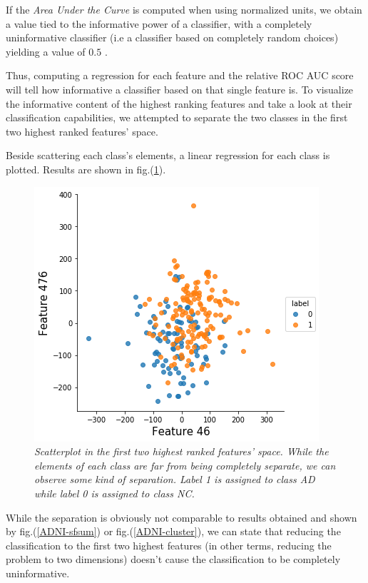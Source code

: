 \documentclass[12pt,openright,twoside,a4paper]{book}
\begin{document}
If the \textit{Area Under the Curve} is computed when using normalized units, we obtain a value tied to the informative power of a classifier, with a completely uninformative classifier (i.e a classifier based on completely random choices) yielding a value of $0.5$ \cite{ROC}.

Thus, computing a regression for each feature and the relative ROC AUC score will tell how informative a classifier based on that single feature is. 
To visualize the informative content of the highest ranking features and take a look at their classification capabilities, we attempted to separate the two classes in the first two highest ranked features' space.

Beside scattering each class's elements, a linear regression for each class is plotted.
Results are shown in fig.(\ref{ADNI-fsep}).

\begin{figure}[!h]
\centering
\includegraphics[scale=0.7]{first-feat-sep}
\caption{\textit{Scatterplot in the first two highest ranked features' space. While  the elements of each class are far from being completely separate, we can observe some kind of separation. Label 1 is assigned to class AD while label 0 is assigned to class NC. }}
\label{ADNI-fsep}
\end{figure}

While the separation is obviously not comparable to results obtained and shown by fig.(\ref{ADNI-sfsum}) or fig.(\ref{ADNI-cluster}), we can state that reducing the classification to the first two highest features (in other terms, reducing the problem to two dimensions) doesn't cause the classification to be completely uninformative.
\end{document}
